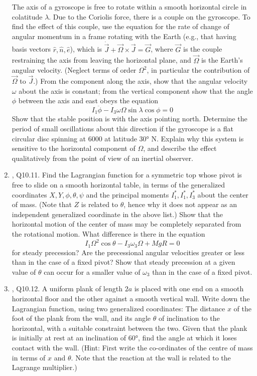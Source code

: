 \documentclass[../psets.tex]{subfiles}
\begin{document}
\begin{enumerate}
    The axis of a gyroscope is free to rotate within a smooth horizontal circle in colatitude $\lambda$. Due to the Coriolis force, there is a couple on the gyroscope. To find the effect of this couple, use the equation for the rate of change of angular momentum in a frame rotating with the Earth (e.g., that having basis vectors $\hat{r},\hat{n},\hat{e}$), which is $\dot{\vec{J}}+\vec{\Omega}\times\vec{J}=\vec{G}$, where $\vec{G}$ is the couple restraining the axis from leaving the horizontal plane, and $\vec{\Omega}$ is the Earth's angular velocity. (Neglect terms of order $\Omega^2$, in particular the contribution of $\vec{\Omega}$ to $\vec{J}$.) From the component along the axis, show that the angular velocity $\omega$ about the axis is constant; from the vertical component show that the angle $\phi$ between the axis and east obeys the equation
    \begin{equation*}
        I_1\ddot{\phi}-I_3\omega\Omega\sin\lambda\cos\phi = 0
    \end{equation*}
    Show that the stable position is with the axis pointing north. Determine the period of small oscillations about this direction if the gyroscope is a flat circular disc spinning at \SI{6000}{\rpm} at latitude \ang{30} N. Explain why this system is sensitive to the horizontal component of $\Omega$, and describe the effect qualitatively from the point of view of an inertial observer.
    \item \textcite{bib:KibbleBerkshire}, Q10.11. Find the Lagrangian function for a symmetric top whose pivot is free to slide on a smooth horizontal table, in terms of the generalized coordinates $X,Y,\phi,\theta,\psi$ and the principal moments $I_1^*,I_1^*,I_3^*$ about the center of mass. (Note that $Z$ is related to $\theta$, hence why it does not appear as an independent generalized coordinate in the above list.) Show that the horizontal motion of the center of mass may be completely separated from the rotational motion. What difference is there in the equation
    \begin{equation*}
        I_1\Omega^2\cos\theta-I_3\omega_3\Omega+MgR = 0
    \end{equation*}
    for steady precession? Are the precessional angular velocities greater or less than in the case of a fixed pivot? Show that steady precession at a given value of $\theta$ can occur for a smaller value of $\omega_3$ than in the case of a fixed pivot.
    \item \textcite{bib:KibbleBerkshire}, Q10.12. A uniform plank of length $2a$ is placed with one end on a smooth horizontal floor and the other against a smooth vertical wall. Write down the Lagrangian function, using two generalized coordinates: The distance $x$ of the foot of the plank from the wall, and its angle $\theta$ of inclination to the horizontal, with a suitable constraint between the two. Given that the plank is initially at rest at an inclination of \ang{60}, find the angle at which it loses contact with the wall. (Hint: First write the co-ordinates of the centre of mass in terms of $x$ and $\theta$. Note that the reaction at the wall is related to the Lagrange multiplier.)
\end{enumerate}
\end{document}

